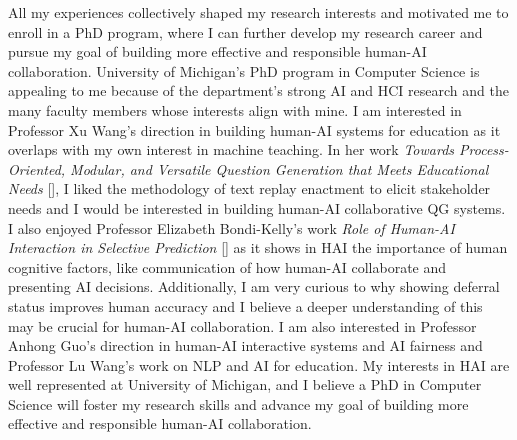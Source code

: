 


All my experiences collectively shaped my research interests and motivated me to enroll in a PhD program, where I can further develop my research career and pursue my goal of building more effective and responsible human-AI collaboration. 
University of Michigan's PhD program in Computer Science is appealing to me because of the department's strong AI and HCI research and the many faculty members whose interests align with mine. 
I am interested in Professor Xu Wang's direction in building human-AI systems for education as it overlaps with my own interest in machine teaching. In her work \textit{Towards Process-Oriented, Modular, and Versatile Question Generation that Meets Educational Needs} [], I liked the methodology of text replay enactment to elicit stakeholder needs and I would be interested in building human-AI collaborative QG systems.
I also enjoyed Professor Elizabeth Bondi-Kelly's work \textit{Role of Human-AI Interaction in Selective Prediction} [] as it shows in HAI the importance of human cognitive factors, like communication of how human-AI collaborate and presenting AI decisions. Additionally, I am very curious to why showing deferral status improves human accuracy and I believe a deeper understanding of this may be crucial for human-AI collaboration. 
I am also interested in Professor Anhong Guo's direction in human-AI interactive systems and AI fairness and Professor Lu Wang's work on NLP and AI for education.
My interests in HAI are well represented at University of Michigan, and I believe a PhD in Computer Science will foster my research skills and advance my goal of building more effective and responsible human-AI collaboration.
